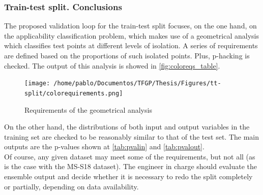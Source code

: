 \subsubsection{Train-test split. Conclusions}
\indent The proposed validation loop for the train-test split focuses, on the one hand, on the applicability classification problem, which makes use of a geometrical analysis which classifies test points at different levels of isolation. A series of requirements are defined based on the proportions of such isolated points. Plus, p-hacking is checked. The output of this analysis is showed in \autoref{fig:coloreqs_table}.\\
%
\begin{figure}[!htb]
	\centering
	\texttt{[image: /home/pablo/Documentos/TFGP/Thesis/Figures/tt-split/colorequirements.png]}
	\caption{Requirements of the geometrical analysis}
	\label{fig:coloreqs_table}
\end{figure}
\indent On the other hand, the distributions of both input and output variables in the training set are checked to be reasonably similar to that of the test set. The main outputs are the p-values shown at \autoref{tab:pvalin} and \autoref{tab:pvalout}.\\
%
\indent Of course, any given dataset may meet some of the requirements, but not all (as is the case with the MS-S18 dataset). The engineer in charge should evaluate the ensemble output and decide whether it is necessary to redo the split completely or partially, depending on data availability.\\
%
\clearpage
